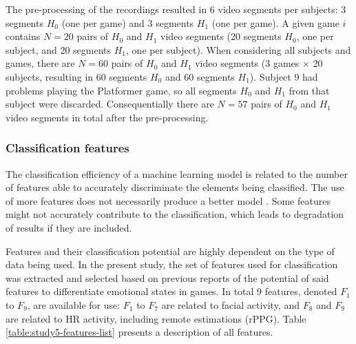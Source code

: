 The pre-processing of the recordings resulted in 6 video segments per subjects: 3 segments $H_0$ (one per game) and 3 segments $H_1$ (one per game). A given game $i$ contains $N=20$ pairs of $H_0$ and $H_1$ video segments (20 segments $H_0$, one per subject, and 20 segments $H_1$, one per subject). When considering all subjects and games, there are $N=60$ pairs of $H_0$ and $H_1$ video segments (3 games $\times$ 20 subjects, resulting in 60 segments $H_0$ and 60 segments $H_1$). Subject 9 had problems playing the Platformer game, so all segments $H_0$ and $H_1$ from that subject were discarded. Consequentially there are $N=57$ pairs of $H_0$ and $H_1$ video segments in total after the pre-processing.

\subsubsection{Classification features}

The classification efficiency of a machine learning model is related to the number of features able to accurately discriminate the elements being classified. The use of more features does not necessarily produce a better model \parencite[Chapter 6]{james2013introduction}. Some features might not accurately contribute to the classification, which leads to degradation of results if they are included.

Features and their classification potential are highly dependent on the type of data being used. In the present study, the set of features used for classification was extracted and selected based on previous reports of the potential of said features to differentiate emotional states in games. In total 9 features, denoted $F_1$ to $F_9$, are available for use: $F_1$ to $F_7$ are related to facial activity, and $F_8$ and $F_9$ are related to HR activity, including remote estimations (rPPG). Table \ref{table:study5-features-list} presents a description of all features.

